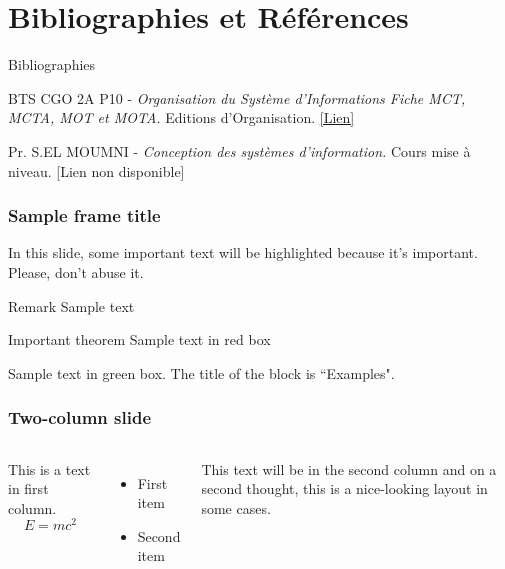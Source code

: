 \documentclass{beamer}
\begin{document}
\section{Bibliographies et Références}
\begin{frame}{Bibliographies}
\begin{thebibliography}{9}

BTS CGO 2A P10 -\textit{ Organisation du Système d’Informations Fiche MCT, MCTA, MOT et MOTA.} Editions d'Organisation. 
\href{https://example.com/merise}{[Lien]} 

Pr. S.EL MOUMNI -\textit{ Conception des systèmes d’information.} Cours mise à niveau. 
\alert{[Lien non disponible]}

\end{thebibliography}
\end{frame}

\begin{frame}
\frametitle{Sample frame title}

In this slide, some important text will be
\alert{highlighted} because it's important.
Please, don't abuse it.

\begin{block}{Remark}
Sample text
\end{block}

\begin{alertblock}{Important theorem}
Sample text in red box
\end{alertblock}

\begin{examples}
Sample text in green box. The title of the block is ``Examples".
\end{examples}
\end{frame}



\begin{frame}
\frametitle{Two-column slide}

\begin{columns}

This is a text in first column.
$$E=mc^2$$
\begin{itemize}
\item First item
\item Second item
\end{itemize}

This text will be in the second column
and on a second thought, this is a nice-looking
layout in some cases.
\end{columns}
\end{frame}
\end{document}

